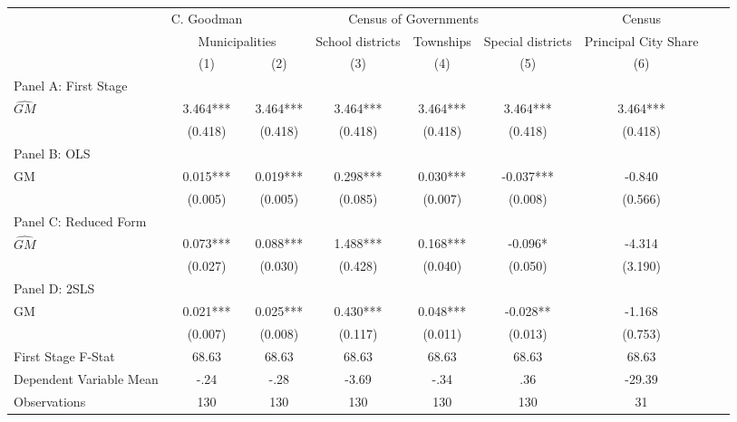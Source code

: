  \begin{tabular}{l*{8}{c}} \toprule
&\multicolumn{1}{c}{C. Goodman}&\multicolumn{4}{c}{Census of Governments}&\multicolumn{1}{c}{Census}\\\cmidrule(lr){2-2}\cmidrule(lr){3-6}\cmidrule(lr){7-7}
&\multicolumn{2}{c}{Municipalities}&\multicolumn{1}{c}{School districts}&\multicolumn{1}{c}{Townships}&\multicolumn{1}{c}{Special districts}&\multicolumn{1}{c}{Principal City Share}\\\cmidrule(lr){2-3}\cmidrule(lr){4-6}\cmidrule(lr){7-7}
&\multicolumn{1}{c}{(1)}&\multicolumn{1}{c}{(2)}&\multicolumn{1}{c}{(3)}&\multicolumn{1}{c}{(4)}&\multicolumn{1}{c}{(5)}&\multicolumn{1}{c}{(6)}\\
\cmidrule(lr){1-7}
\multicolumn{6}{l}{Panel A: First Stage}\\
\cmidrule(lr){1-7}
$\widehat{GM}$  &    3.464***&    3.464***&    3.464***&    3.464***&    3.464***&    3.464***\\
                &  (0.418)   &  (0.418)   &  (0.418)   &  (0.418)   &  (0.418)   &  (0.418)   \\
\cmidrule(lr){1-7}
\multicolumn{6}{l}{Panel B: OLS}\\
\cmidrule(lr){1-7}
GM              &    0.015***&    0.019***&    0.298***&    0.030***&   -0.037***&   -0.840   \\
                &  (0.005)   &  (0.005)   &  (0.085)   &  (0.007)   &  (0.008)   &  (0.566)   \\
\cmidrule(lr){1-7}
\multicolumn{6}{l}{Panel C: Reduced Form}\\
\cmidrule(lr){1-7}
$\widehat{GM}$  &    0.073***&    0.088***&    1.488***&    0.168***&   -0.096*  &   -4.314   \\
                &  (0.027)   &  (0.030)   &  (0.428)   &  (0.040)   &  (0.050)   &  (3.190)   \\
\cmidrule(lr){1-7}
\multicolumn{6}{l}{Panel D: 2SLS}\\
\cmidrule(lr){1-7}
GM              &    0.021***&    0.025***&    0.430***&    0.048***&   -0.028** &   -1.168   \\
                &  (0.007)   &  (0.008)   &  (0.117)   &  (0.011)   &  (0.013)   &  (0.753)   \\
\midrule
First Stage F-Stat&    68.63   &    68.63   &    68.63   &    68.63   &    68.63   &    68.63   \\
Dependent Variable Mean&     -.24   &     -.28   &    -3.69   &     -.34   &      .36   &   -29.39   \\
Observations    &      130   &      130   &      130   &      130   &      130   &       31   \\
       \bottomrule \end{tabular}
